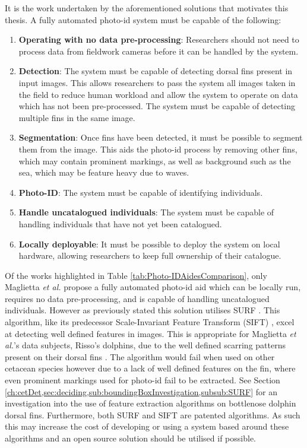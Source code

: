 It is the work undertaken by the aforementioned solutions that motivates this thesis. A fully automated photo-id system must be capable of the following:

\begin{enumerate}

\item\textbf{Operating with no data pre-processing}: Researchers should not need to process data from fieldwork cameras before it can be handled by the system. 

\item\textbf{Detection}: The system must be capable of detecting dorsal fins present in input images. This allows researchers to pass the system all images taken in the field to reduce human workload and allow the system to operate on data which has not been pre-processed. The system must be capable of detecting multiple fins in the same image.

\item\textbf{Segmentation}: Once fins have been detected, it must be possible to segment them from the image. This aids the photo-id process by removing other fins, which may contain prominent markings, as well as background such as the sea, which may be feature heavy due to waves.

\item\textbf{Photo-ID}: The system must be capable of identifying individuals.

\item\textbf{Handle uncatalogued individuals}: The system must be capable of handling individuals that have not yet been catalogued. 

\item\textbf{Locally deployable}: It must be possible to deploy the system on local hardware, allowing researchers to keep full ownership of their catalogue.

\end{enumerate}

Of the works highlighted in Table \ref{tab:Photo-IDAidesComparison}, only Maglietta \textit{et al.} propose a fully automated photo-id aid which can be locally run, requires no data pre-processing, and is capable of handling uncatalogued individuals. However as previously stated this solution utilises SURF \cite{bay_speeded-up_2008}. This algorithm, like its predecessor Scale-Invariant Feature Transform (SIFT) \cite{lowe_object_1999}, excel at detecting well defined features in images. This is appropriate for Maglietta \textit{et al.}'s data subjects, Risso's dolphins, due to the well defined scarring patterns present on their dorsal fins \cite{mariani_analysis_2016}. The algorithm would fail when used on other cetacean species however due to a lack of well defined features on the fin, where even prominent markings used for photo-id fail to be extracted. See Section \ref{ch:cetDet,sec:deciding,sub:boundingBoxInvestigation,subsub:SURF} for an investigation into the use of feature extraction algorithms on bottlenose dolphin dorsal fins. Furthermore, both SURF and SIFT are patented algorithms. As such this may increase the cost of developing or using a system based around these algorithms and an open source solution should be utilised if possible.

